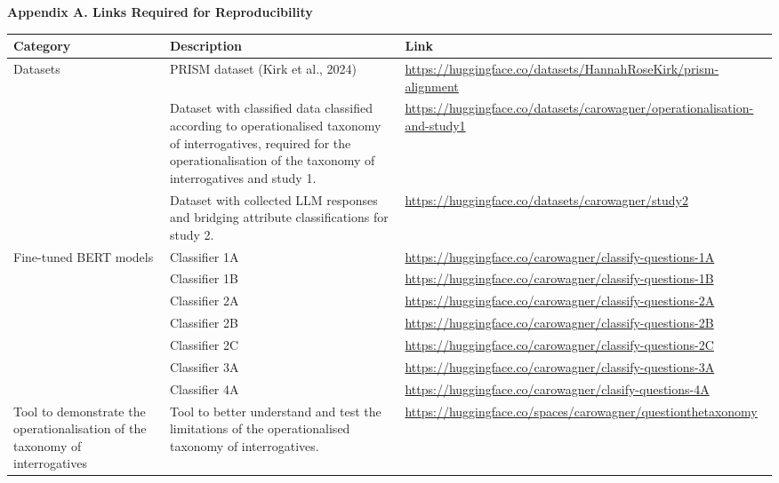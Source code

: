 \documentclass{article}
\begin{document}
\begin{center}
\textbf{\large Appendix A. Links Required for Reproducibility}
\end{center}

\vspace{1em}

{\small
\renewcommand{\arraystretch}{1.2}
\begin{tabular}{p{3.5cm} p{6.5cm} p{8cm}}
\toprule
\textbf{Category} & \textbf{Description} & \textbf{Link} \\
\midrule
Datasets & PRISM dataset (Kirk et al., 2024) & \url{https://huggingface.co/datasets/HannahRoseKirk/prism-alignment} \\
\addlinespace[0.7em]
 & Dataset with classified data classified according to operationalised taxonomy of interrogatives, required for the operationalisation of the taxonomy of interrogatives and study 1. & \url{https://huggingface.co/datasets/carowagner/operationalisation-and-study1} \\
\addlinespace[0.7em]
 & Dataset with collected LLM responses and bridging attribute classifications for study 2. & \url{https://huggingface.co/datasets/carowagner/study2} \\
\addlinespace[0.7em]
Fine-tuned BERT models & Classifier 1A & \url{https://huggingface.co/carowagner/classify-questions-1A} \\
\addlinespace[0.7em]
 & Classifier 1B & \url{https://huggingface.co/carowagner/classify-questions-1B} \\
\addlinespace[0.7em]
 & Classifier 2A & \url{https://huggingface.co/carowagner/classify-questions-2A} \\
\addlinespace[0.7em]
 & Classifier 2B & \url{https://huggingface.co/carowagner/classify-questions-2B} \\
\addlinespace[0.7em]
 & Classifier 2C & \url{https://huggingface.co/carowagner/classify-questions-2C} \\
\addlinespace[0.7em]
 & Classifier 3A & \url{https://huggingface.co/carowagner/classify-questions-3A} \\
\addlinespace[0.7em]
 & Classifier 4A & \url{https://huggingface.co/carowagner/clasify-questions-4A} \\
\addlinespace[0.7em]
Tool to demonstrate the operationalisation of the taxonomy of interrogatives & Tool to better understand and test the limitations of the operationalised taxonomy of interrogatives. & \url{https://huggingface.co/spaces/carowagner/questionthetaxonomy} \\
\bottomrule
\end{tabular}
}
\end{document}
